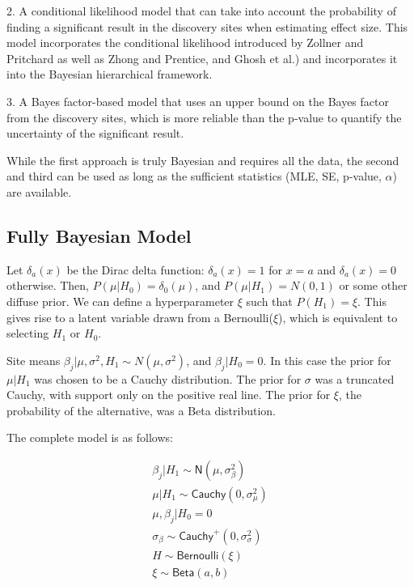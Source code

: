 \documentclass[AMA,STIX1COL]{WileyNJD-v2}\usepackage[]{graphicx}\usepackage[]{color}
\begin{document}
2. A conditional likelihood model that can take into account the probability of finding a significant result in the discovery sites when estimating effect size. This model incorporates the conditional likelihood introduced by Zollner and Pritchard as well as Zhong and Prentice, and Ghosh et al.)\cite{zollner2007overcoming, zhong2008bias, ghosh2008estimating} and incorporates it into the Bayesian hierarchical framework.

3. A Bayes factor-based model that uses an upper bound on the Bayes factor from the discovery sites, which is more reliable than the p-value \cite{benjamin2017redefine} to quantify the uncertainty of the significant result.

While the first approach is truly Bayesian and requires all the data, the second and third can be used as long as the sufficient statistics (MLE, SE, p-value, $\alpha$) are available. 


\subsection{Fully Bayesian Model}

Let $\delta_a(x)$ be the Dirac delta function: $\delta_a(x) = 1$ for $x = a$ and $\delta_a(x)=0$ otherwise. Then, $P( \mu|H_0) = \delta_0 ( \mu )$,  and $P( \mu|H_1) = N(0,1)$ or some other diffuse prior. We can define a hyperparameter $\xi$ such that $P(H_1) = \xi$. This gives rise to a latent variable drawn from a Bernoulli($\xi$), which is equivalent to selecting $H_1$ or $H_0$.

Site means $\beta_{j}|\mu, \sigma^2,H_1 \sim N(\mu, \sigma^2)$, and $\beta_{j}|H_0 = 0$. In this case the prior for  $\mu| H_1$ was chosen to be a Cauchy distribution. The prior for $\sigma$ was a truncated Cauchy, with support only on the positive real line. The prior for $\xi$, the probability of the alternative, was a Beta distribution. 

The complete model is as follows:

\begin{gather}\label{eq3}
\beta_{j}|H_ 1 \sim \textsf{N}(\mu, \sigma_{\beta}^{2}) \\
\mu|H_1\sim \textsf{Cauchy}(0,\sigma_{\mu}^{2})\\
\mu, \beta_{j}|H_0  =0\\
\sigma_{\beta}\sim \textsf{Cauchy}^+(0,\sigma_{\sigma}^{2})\\
H\sim \textsf{Bernoulli}(\xi)\\
\xi \sim \textsf{Beta}(a, b)
\end{gather}
\end{document}
